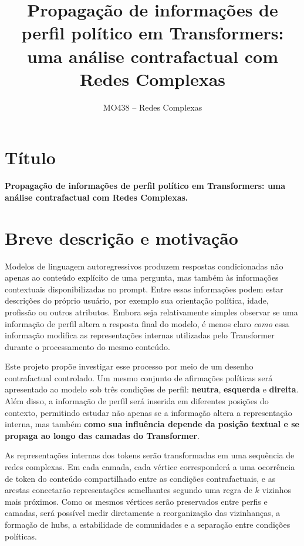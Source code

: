 \documentclass[11pt,a4paper]{article}
\title{\textbf{Propagação de informações de perfil político em Transformers:}\\
uma análise contrafactual com Redes Complexas}
\author{MO438 -- Redes Complexas}
\date{}
\begin{document}
\maketitle

\section{Título}

\textbf{Propagação de informações de perfil político em Transformers: uma análise contrafactual com Redes Complexas.}

\section{Breve descrição e motivação}

Modelos de linguagem autoregressivos produzem respostas condicionadas não apenas ao conteúdo explícito de uma pergunta, mas também às informações contextuais disponibilizadas no prompt. Entre essas informações podem estar descrições do próprio usuário, por exemplo sua orientação política, idade, profissão ou outros atributos. Embora seja relativamente simples observar se uma informação de perfil altera a resposta final do modelo, é menos claro \emph{como} essa informação modifica as representações internas utilizadas pelo Transformer durante o processamento do mesmo conteúdo.

Este projeto propõe investigar esse processo por meio de um desenho contrafactual controlado. Um mesmo conjunto de afirmações políticas será apresentado ao modelo sob três condições de perfil: \textbf{neutra}, \textbf{esquerda} e \textbf{direita}. Além disso, a informação de perfil será inserida em diferentes posições do contexto, permitindo estudar não apenas se a informação altera a representação interna, mas também \textbf{como sua influência depende da posição textual e se propaga ao longo das camadas do Transformer}.

As representações internas dos tokens serão transformadas em uma sequência de redes complexas. Em cada camada, cada vértice corresponderá a uma ocorrência de token do conteúdo compartilhado entre as condições contrafactuais, e as arestas conectarão representações semelhantes segundo uma regra de $k$ vizinhos mais próximos. Como os mesmos vértices serão preservados entre perfis e camadas, será possível medir diretamente a reorganização das vizinhanças, a formação de hubs, a estabilidade de comunidades e a separação entre condições políticas.
\end{document}
